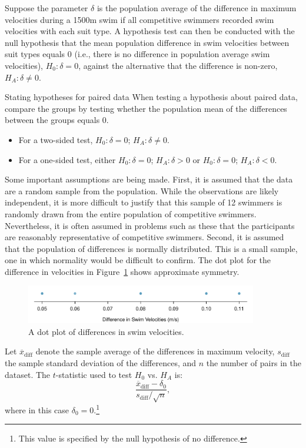 Suppose the parameter $\delta$ is the population average of the difference in maximum velocities during a 1500m swim if all competitive swimmers recorded swim velocities with each suit type. A hypothesis test can then be conducted with the null hypothesis that the mean population difference in swim velocities between suit types equals 0 (i.e., there is no difference in population average swim velocities), $H_0: \delta = 0$, against the alternative that the difference is non-zero, $H_A: \delta \neq 0$.

\begin{onebox}{Stating hypotheses for paired data}
When testing a hypothesis about paired data, compare the groups by testing whether the population mean of the differences between the groups equals 0.
\begin{itemize}
\item For a two-sided test, $H_0: \delta = 0$; $H_A: \delta \neq 0$.
\item For a one-sided test, either $H_0: \delta = 0$; $H_A: \delta > 0$ or  $H_0: \delta = 0$; $H_A: \delta < 0$.
\end{itemize}
\end{onebox}

Some important assumptions are being made. First, it is assumed that the data are a random sample from the population. While the observations are likely independent, it is more difficult to justify that this sample of 12 swimmers is randomly drawn from the entire population of competitive swimmers. Nevertheless, it is often assumed in problems such as these that the participants are reasonably representative of competitive swimmers. Second, it is assumed that the population of differences is normally distributed. This is a small sample, one in which normality would be difficult to confirm. The dot plot for the difference in velocities in Figure~\ref{swimDotPlot} shows approximate symmetry.

\begin{figure}[h]
	\centering
	\includegraphics[width=0.9\textwidth]{ch_inference_for_means_oi_biostat/figures/swimDotPlot/swimDotPlot}
	\caption{A dot plot of differences in swim velocities.}
	\label{swimDotPlot}
\end{figure}

Let $\overline{x}_{\text{diff}}$ denote the sample average of the differences in maximum velocity, $s_{\text{diff}}$ the sample standard deviation of the differences, and $n$ the number of pairs in the dataset. The $t$-statistic used to test $H_0$ vs. $H_A$ is:
\[\frac{\overline{x}_{\text{diff}} - \delta_0} {s_{\text{diff}}/\sqrt{n}},\]
where in this case $\delta_0 = 0$.\footnote{This value is specified by the null hypothesis of no difference.}

